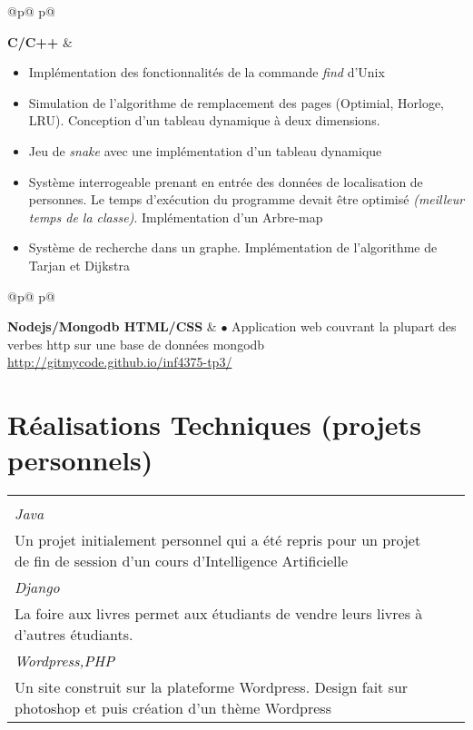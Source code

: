 \documentclass[a4paper,10pt]{extarticle}
\makeatletter
\newlength{\indicewidth}%
\newlength{\separatorcolumnwidth}%
\newlength{\maincolumnwidth}%
\newlength{\spacecvline}%
\newcommand{\cvdetailitem}[3][\spacecvline]{
\noindent\begin{tabular}
{@{}p{\indicewidth}@{\hspace{\separatorcolumnwidth}} p{\maincolumnwidth}@{}}
	\raggedright{\bf{#2}} &{ #3}%
\end{tabular}%
\vspace{-0.9em}\par\addvspace{#1}  }
\newcommand{\cvdetaillist}[3][.25em]{}
\renewcommand{\cvdetaillist}[3][.25em]{%
  \cvdetailitem[#1]{#2}{#3}}
\newcommand{\cvboxitem}[5]{}
\renewcommand{\cvboxitem}[5]{%
	\begin{minipage}[t]{\linewidth}
	
	$\bullet$ \textbf{#1}\ifthenelse{\equal{#2}{}}{}{, {\slshape #2}}\par%
	\raggedright{\scriptsize\href{#3}{#3}}\\
	{\small\slshape\color{Bittersweet} {#4}}\vspace{0.2em}\\
	{#5}

	\end{minipage}
	
}
\newcommand{\cvtriplebox}[3]{}
\renewcommand{\cvtriplebox}[3]{
\begin{tabular*}{\linewidth}{  
                   p{\dimexpr 0.33\linewidth-1\tabcolsep } 
                   p{\dimexpr 0.33\linewidth-1\tabcolsep }  
                   p{\dimexpr 0.33\linewidth-1\tabcolsep } 
                   } 
{#1}&{#2}&{#3}\tabularnewline
\end{tabular*}
}
\makeatother
\begin{document}
\cvdetaillist{C/C++}{
\begin{itemize}\setlength{\itemsep}{1pt}
  \setlength{\parskip}{5pt}
  \setlength{\parsep}{0pt}
\item Implémentation des fonctionnalités de la commande \emph{find} d'Unix
\item Simulation de l'algorithme de remplacement des pages (Optimial, Horloge, LRU). Conception d'un tableau dynamique à deux dimensions.

\item Jeu de \emph{snake} avec une implémentation d'un tableau dynamique
\item Système interrogeable prenant en entrée des données de localisation de personnes. Le temps d'exécution du programme devait être optimisé \emph{(meilleur temps de la classe)}. Implémentation d'un Arbre-map
\item Système de recherche dans un graphe. Implémentation de l'algorithme de Tarjan et Dijkstra
\end{itemize}
}
\cvdetaillist{\small Nodejs/Mongodb HTML/CSS}{$\bullet$ Application web couvrant la plupart des verbes http sur une base de données mongodb   \newline\small{\href{http://gitmycode.github.io/inf4375-tp3/}{http://gitmycode.github.io/inf4375-tp3/}}}
\vspace{1em}\par










\vspace{-0.5em}
\section{Réalisations Techniques \small(projets personnels)}

\cvtriplebox
{\cvboxitem{MineSweeper AI}{}{https://github.com/GitMyCode/Minesweeper-AI}{Java}
{Un projet initialement personnel qui a été repris pour un projet de fin de session d'un cours d'Intelligence Artificielle}}
{\cvboxitem{EnceFal}{projet en collaboration}{http://foireauxlivres.uqam.ca/}{Django}
{La foire aux livres permet aux étudiants de vendre leurs livres à d'autres étudiants.}}
{
\cvboxitem{Site web}{}{www.courspiano.ca}{Wordpress,PHP}
{Un site construit sur la plateforme Wordpress. Design fait sur photoshop et puis création d'un thème Wordpress}
}
\end{document}
